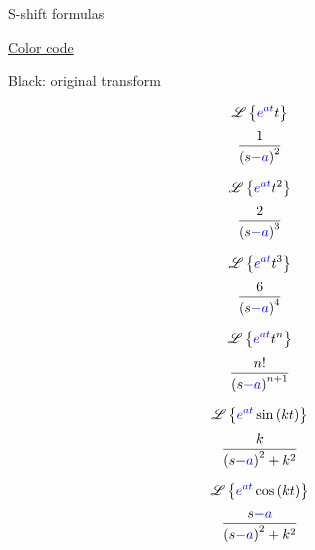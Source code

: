 \documentclass[grid, poker_landscape]{flashcards}
\newcommand{\Lap}{\ensuremath{\mathscr{L}}}
\begin{document}

  \begin{flashcard}{ S-shift formulas  }
    \begin{minipage}[t]{0.8\columnwidth}
      \begin{center}
        \uline{Color code}
      \end{center}
      \begin{flushleft}
        Black: original transform \\
        \color{blue}{Blue: s-shift}
      \end{flushleft}
    \end{minipage}
  \end{flashcard}

  \begin{flashcard}{ \[ \Lap\left\{ {\color{blue}e^{at}}t\right\} \] }
    \[
      \frac{1}{\left(s{\color{blue}-a}\right)^{2}}
    \]
  \end{flashcard}

  \begin{flashcard}{ \[ \Lap\left\{ {\color{blue}e^{at}}t^{2}\right\} \] }
    \[
      \frac{2}{\left(s{\color{blue}-a}\right)^{3}}
    \]
  \end{flashcard}

  \begin{flashcard}{ \[ \Lap\left\{ {\color{blue}e^{at}}t^{3}\right\} \] }
    \[
      \frac{6}{\left(s{\color{blue}-a}\right)^{4}}
    \]
  \end{flashcard}
  
  \begin{flashcard}{ \[ \Lap\left\{ {\color{blue}e^{at}}t^{n}\right\}  \] }
    \[
      \frac{n!}{\left(s{\color{blue}-a}\right)^{n+1}}
    \]
  \end{flashcard}

  \begin{flashcard}{ \[ \Lap\left\{ 
      {\color{blue}e^{at}} \sin \left( kt \right)
    \right\} \] }
    \[
      \frac{k}{\left( s {\color{blue}-a} \right)^{2} + k^{2}}
    \]
  \end{flashcard}

  \begin{flashcard}{ \[ \Lap\left\{
      {\color{blue}e^{at}} \cos \left( kt \right)
    \right\} \] }
    \[
      \frac{s{\color{blue}-a}}{\left( s {\color{blue}-a} \right)^{2} + k^{2}}
    \]
  \end{flashcard}
\end{document}
